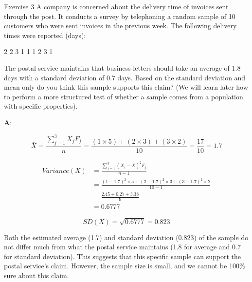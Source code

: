 \documentclass[
  ignorenonframetext,
  aspectratio=43,
]{beamer}
\begin{document}
\begin{frame}{Exercise 3}
\protect\hypertarget{exercise-3}{}
A company is concerned about the delivery time of invoices sent through
the post. It conducts a survey by telephoning a random sample of 10
customers who were sent invoices in the previous week. The following
delivery times were reported (days): \vspace{5pt}

\begin{center}
 2 2 3 1 1 1 2 3 1 
\end{center}

\vspace{2pt}

The postal service maintains that business letters should take an
average of 1.8 days with a standard deviation of 0.7 days. Based on the
standard deviation and mean only do you think this sample supports this
claim? (We will learn later how to perform a more structured test of
whether a sample comes from a population with specific properties).
\end{frame}

\begin{frame}{}
\protect\hypertarget{section-5}{}
\textbf{A}:

\[
\bar{X} = 
\frac{\sum_{j=1}^{3} X_j F_j}{n}
= \frac{(1 \times 5) + (2 \times 3) + (3 \times 2)}{10}
= \frac{17}{10}
= 1.7
\]

\[
\begin{aligned}
Variance(X) &=
\frac{\sum_{j=1}^{3} (X_i - \bar{X})^2 F_j}{n - 1} \\
&= \frac{(1 - 1.7)^2 \times 5 + (2 - 1.7)^2 \times 3 + (3 - 1.7)^2 \times 2}{10 - 1} \\ 
& = \frac{2.45 + 0.27 + 3.38}{9} \\
& = 0.6777
\end{aligned}
\]
\end{frame}

\begin{frame}{}
\protect\hypertarget{section-6}{}
\[
SD(X) = \sqrt{0.6777} = 0.823
\]

Both the estimated average (1.7) and standard deviation (0.823) of the
sample do not differ much from what the postal service maintains (1.8
for average and 0.7 for standard deviation). This suggests that this
specific sample can support the postal service's claim. However, the
sample size is small, and we cannot be 100\% sure about this claim.
\end{frame}
\end{document}
